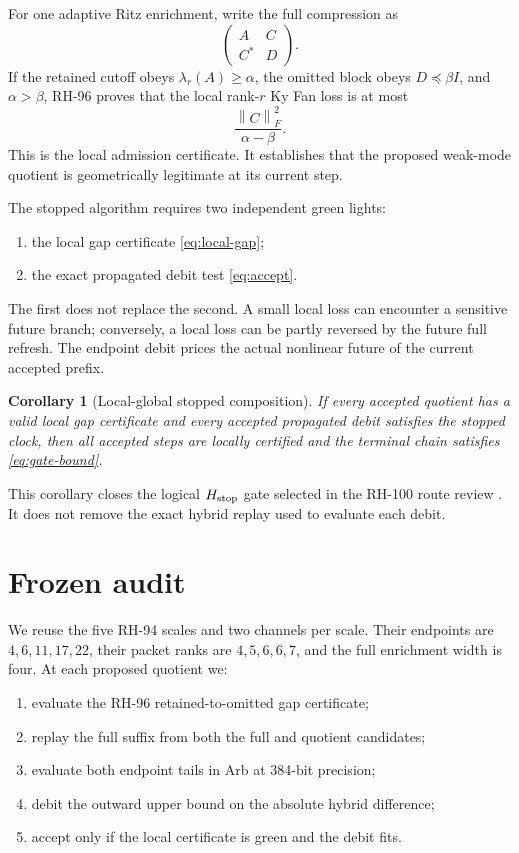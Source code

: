 \documentclass[11pt]{article}
\newtheorem{corollary}[theorem]{Corollary}
\theoremstyle{definition}
\theoremstyle{remark}
\newcommand{\norm}[1]{\left\lVert#1\right\rVert}
\begin{document}
For one adaptive Ritz enrichment, write the full compression as
\[
 \begin{pmatrix}A&C\\C^*&D\end{pmatrix}.
\]
If the retained cutoff obeys $\lambda_r(A)\ge\alpha$, the omitted block obeys
$D\preceq\beta I$, and $\alpha>\beta$, RH-96 proves that the local rank-$r$
Ky Fan loss is at most
\begin{equation}
 \frac{\norm C_F^2}{\alpha-\beta}.
 \label{eq:local-gap}
\end{equation}
This is the local admission certificate.  It establishes that the proposed
weak-mode quotient is geometrically legitimate at its current step.

The stopped algorithm requires two independent green lights:
\begin{enumerate}[leftmargin=2em]
\item the local gap certificate \eqref{eq:local-gap};
\item the exact propagated debit test \eqref{eq:accept}.
\end{enumerate}
The first does not replace the second.  A small local loss can encounter a
sensitive future branch; conversely, a local loss can be partly reversed by
the future full refresh.  The endpoint debit prices the actual nonlinear
future of the current accepted prefix.

\begin{corollary}[Local-global stopped composition]
\label{cor:composition}
If every accepted quotient has a valid local gap certificate and every
accepted propagated debit satisfies the stopped clock, then all accepted
steps are locally certified and the terminal chain satisfies
\eqref{eq:gate-bound}.
\end{corollary}

This corollary closes the logical $H_{\rm stop}$ gate selected in the RH-100
route review \citep{WangHundredLayer2026}.  It does not remove the exact
hybrid replay used to evaluate each debit.

\section{Frozen audit}
\label{sec:audit}

We reuse the five RH-94 scales and two channels per scale.  Their endpoints
are $4,6,11,17,22$, their packet ranks are $4,5,6,6,7$, and the full enrichment
width is four.  At each proposed quotient we:
\begin{enumerate}[leftmargin=2em]
\item evaluate the RH-96 retained-to-omitted gap certificate;
\item replay the full suffix from both the full and quotient candidates;
\item evaluate both endpoint tails in Arb at 384-bit precision;
\item debit the outward upper bound on the absolute hybrid difference;
\item accept only if the local certificate is green and the debit fits.
\end{enumerate}
\end{document}
